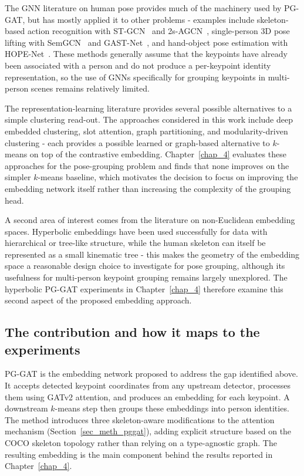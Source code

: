The GNN literature on human pose provides much of the machinery used by PG-GAT,
but has mostly applied it to other problems -
examples include skeleton-based action recognition
with ST-GCN~\cite{yan2018stgcn} and 2s-AGCN~\cite{shi2019twostreamadaptive},
single-person 3D pose lifting with SemGCN~\cite{zhao2019semanticgcn} and GAST-Net~\cite{liu2020gastnet},
and hand-object pose estimation with HOPE-Net~\cite{doosti2020hopenet}.
These methods generally assume that the keypoints have already been associated with a person
and do not produce a per-keypoint identity representation,
so the use of GNNs specifically for grouping keypoints in multi-person scenes remains relatively limited.

The representation-learning literature provides several possible alternatives to a simple clustering read-out.
The approaches considered in this work include deep embedded clustering, slot attention,
graph partitioning, and modularity-driven clustering -
each provides a possible learned or graph-based alternative to $k$-means on top of the contrastive embedding.
Chapter~\ref{chap_4} evaluates these approaches for the pose-grouping problem
and finds that none improves on the simpler $k$-means baseline,
which motivates the decision to focus on improving the embedding network itself
rather than increasing the complexity of the grouping head.

A second area of interest comes from the literature on non-Euclidean embedding spaces.
Hyperbolic embeddings have been used successfully for data with hierarchical or tree-like structure,
while the human skeleton can itself be represented as a small kinematic tree -
this makes the geometry of the embedding space a reasonable design choice to investigate for pose grouping,
although its usefulness for multi-person keypoint grouping remains largely unexplored.
The hyperbolic PG-GAT experiments in Chapter~\ref{chap_4}
therefore examine this second aspect of the proposed embedding approach.

\subsection{The contribution and how it maps to the experiments}
\label{sec_lit_gap_contribution}

PG-GAT is the embedding network proposed to address the gap identified above.
It accepts detected keypoint coordinates from any upstream detector,
processes them using GATv2 attention,
and produces an embedding for each keypoint.
A downstream $k$-means step then groups these embeddings into person identities.
The method introduces three skeleton-aware modifications to the attention mechanism (Section~\ref{sec_meth_pggat}),
adding explicit structure based on the COCO skeleton topology rather than relying on a type-agnostic graph.
The resulting embedding is the main component behind the results reported in Chapter~\ref{chap_4}.

